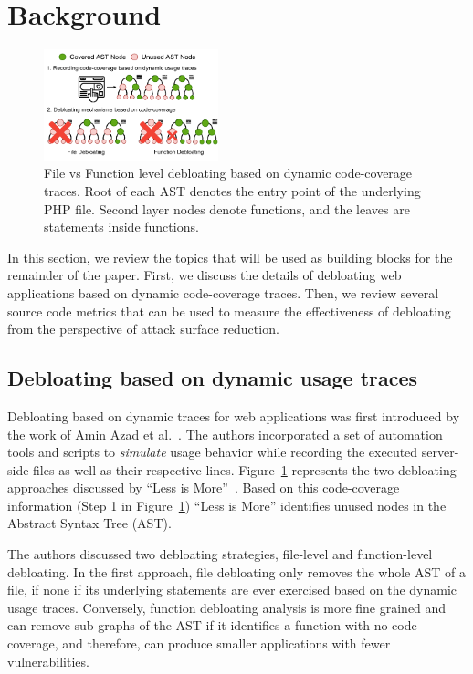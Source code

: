 \section{Background}

\begin{figure}[t]
    \centering
    \includegraphics[width=0.45\textwidth]{figures/dbltr/file_vs_function_debloating.drawio.pdf}
    \caption{File vs Function level debloating based on dynamic code-coverage traces. Root of each AST denotes the entry point of the underlying PHP file. Second layer nodes denote functions, and the leaves are statements inside functions.}
    \label{fig:file_vs_func_debloating}
\end{figure}

In this section, we review the topics that will be used as building blocks for the remainder of the paper. 
First, we discuss the details of debloating web applications based on dynamic code-coverage traces. 
Then, we review several source code metrics that can be used to measure the effectiveness of debloating from the perspective of attack surface reduction.

\subsection{Debloating based on dynamic usage traces}
Debloating based on dynamic traces for web applications was first introduced by the work of Amin Azad et al.~\cite{lessismore}. 
The authors incorporated a set of automation tools and scripts to \emph{simulate} usage behavior while recording the executed server-side files as well as their respective lines.
Figure~\ref{fig:file_vs_func_debloating} represents the two debloating approaches discussed by ``Less is More''~\cite{lessismore}. 
Based on this code-coverage information (Step 1 in Figure~\ref{fig:file_vs_func_debloating}) ``Less is More'' identifies unused nodes in the Abstract Syntax Tree (AST). 

The authors discussed two debloating strategies, file-level and function-level debloating. 
In the first approach, file debloating only removes the whole AST of a file, if none if its underlying statements are ever exercised based on the dynamic usage traces. 
Conversely, function debloating analysis is more fine grained and can remove sub-graphs of the AST if it identifies a function with no code-coverage, and therefore, can produce smaller applications with fewer vulnerabilities. 

